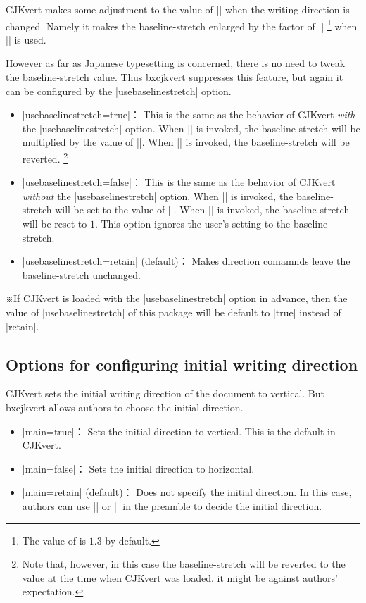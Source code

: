 \documentclass[a4paper]{ltjsarticle}
\newcommand{\Pkg}[1]{\textsf{#1}}
\newcommand{\Note}{\par\noindent ※}
\newcommand{\Means}{：\quad}
\begin{document}
\Pkg{CJKvert} makes some adjustment to the value of |\baselinestretch|
when the writing direction is changed.
Namely it makes the baseline-stretch enlarged by the factor of
|\CJKbaselinestretch|%
\footnote{The value of  is $1.3$ by default.}
when |\CJKvert| is used.

However as far as Japanese typesetting is concerned,
there is no need to tweak the baseline-stretch value.
Thus \Pkg{bxcjkvert} suppresses this feature, but again
it can be configured by the |usebaselinestretch| option.


\begin{itemize}
\item |usebaselinestretch=true|\Means
  This is the same as the behavior of \Pkg{CJKvert} \emph{with}
  the |usebaselinestretch| option.
  When |\CJKvert| is invoked, the baseline-stretch will be multiplied
  by the value of |\CJKbaselinestretch|.
  When |\CJKhorz| is invoked, the baseline-stretch will be reverted.%
  \footnote{Note that, however, in this case the baseline-stretch will
    be reverted to the value at the time when \Pkg{CJKvert} was loaded.
    it might be against authors' expectation.}
\item |usebaselinestretch=false|\Means
  This is the same as the behavior of \Pkg{CJKvert} \emph{without}
  the |usebaselinestretch| option.
  When |\CJKvert| is invoked, the baseline-stretch will be set
  to the value of |\CJKbaselinestretch|.
  When |\CJKhorz| is invoked, the baseline-stretch will be
  reset to $1$.
  This option ignores the user's setting to the baseline-stretch.
\item |usebaselinestretch=retain| (default)\Means
  Makes direction comamnds leave the baseline-stretch
  unchanged.
\end{itemize}

\Note If \Pkg{CJKvert} is loaded with the |usebaselinestretch|
option in advance,
then the value of |usebaselinestretch| of this package
will be default to |true| instead of |retain|.

\subsection{Options for configuring initial writing direction}

\Pkg{CJKvert} sets the initial writing direction of the document
to vertical.
But \Pkg{bxcjkvert} allows authors to choose the initial direction.

\begin{itemize}
\item |main=true|\Means
  Sets the initial direction to vertical.
  This is the default in \Pkg{CJKvert}.
\item |main=false|\Means
  Sets the initial direction to horizontal.
\item |main=retain| (default)\Means
  Does not specify the initial direction.
  In this case, authors can use |\CJKvert| or |\CJKhorz|
  in the preamble to decide the initial direction.
\end{itemize}

\end{document}
